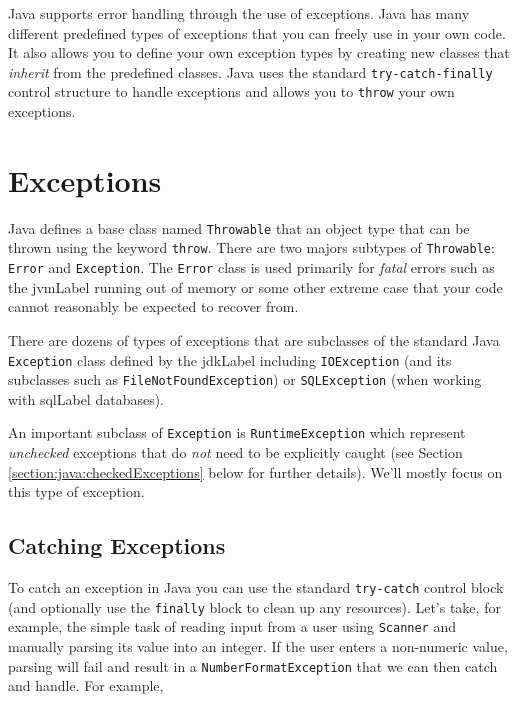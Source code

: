 

Java supports error handling through the use of exceptions.
Java has many different predefined types of exceptions that
you can freely use in your own code.  It also allows you to
define your own exception types by creating new classes
that \emph{inherit} from the predefined classes.  Java uses
the standard \texttt{try-catch-finally} control structure
to handle exceptions and allows you to \texttt{throw}
your own exceptions.

\section{Exceptions}

Java defines a base class named \texttt{Throwable}
that an object type that can be thrown using the keyword
\texttt{throw}.  There are two majors subtypes of
\texttt{Throwable}: \texttt{Error} and 
\texttt{Exception}.  The \texttt{Error} class
is used primarily for \emph{fatal} errors such as the \gls{jvmLabel}
running out of memory or some other extreme case that your
code cannot reasonably be expected to recover from.  

There are dozens of types of exceptions that are subclasses
of the standard Java \texttt{Exception} class defined by
the \gls{jdkLabel} including \texttt{IOException} 
(and its subclasses such as \texttt{FileNotFoundException})
or \texttt{SQLException} (when working with \gls{sqlLabel}
databases).

An important subclass of \texttt{Exception} is 
\texttt{RuntimeException} which represent \emph{unchecked}
exceptions that do \emph{not} need to be explicitly caught
(see Section \ref{section:java:checkedExceptions} below for 
further details).  We'll mostly focus on this type of exception.

\subsection{Catching Exceptions}

To catch an exception in Java you can use the standard
\texttt{try-catch} control block (and optionally
use the \texttt{finally} block to clean up any
resources).  Let's take, for example, the simple task of
reading input from a user using \texttt{Scanner}
and manually parsing its value into an integer.  If the
user enters a non-numeric value, parsing will fail
and result in a \texttt{NumberFormatException}
that we can then catch and handle. For example, 

